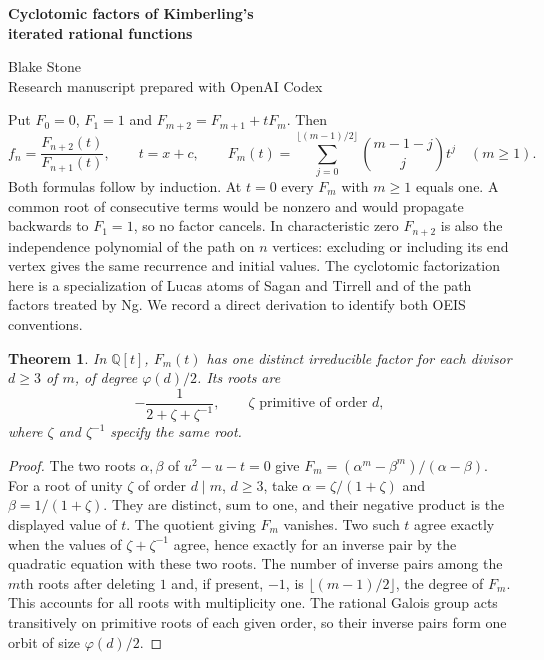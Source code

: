 \documentclass[11pt,letterpaper]{article}
\newtheorem{theorem}{Theorem}
\begin{document}
\thispagestyle{plain}
\begin{center}
{\LARGE\bfseries Cyclotomic factors of Kimberling's\\[0.12em] iterated rational functions\par}
\vspace{0.5em}
Blake Stone\\
{\small Research manuscript prepared with OpenAI Codex}
\end{center}

\begin{abstract}
Starting from $f_0=1$, iterate $f_n=1+(x+c)/f_{n-1}$. Over the rationals the reduced numerator for $n>2$ is irreducible exactly when $n+2$ is prime, as Clark Kimberling conjectured. We identify the problem with the known factorization of path independence polynomials, explain the different indexing of the tiling triangle, and describe the degrees and multiplicities of all factors over finite fields.
\end{abstract}

Put $F_0=0$, $F_1=1$ and $F_{m+2}=F_{m+1}+tF_m$. Then
\[
 f_n=\frac{F_{n+2}(t)}{F_{n+1}(t)},\qquad t=x+c,\qquad
 F_m(t)=\sum_{j=0}^{\lfloor(m-1)/2\rfloor}\binom{m-1-j}{j}t^j\quad(m\ge1).
\]
Both formulas follow by induction. At $t=0$ every $F_m$ with $m\ge1$ equals one. A common root of consecutive terms would be nonzero and would propagate backwards to $F_1=1$, so no factor cancels. In characteristic zero $F_{n+2}$ is also the independence polynomial of the path on $n$ vertices: excluding or including its end vertex gives the same recurrence and initial values. The cyclotomic factorization here is a specialization of Lucas atoms of Sagan and Tirrell and of the path factors treated by Ng. We record a direct derivation to identify both OEIS conventions.

\begin{theorem}
In $\mathbb Q[t]$, $F_m(t)$ has one distinct irreducible factor for each divisor $d\ge3$ of $m$, of degree $\varphi(d)/2$. Its roots are
\[
          -\frac{1}{2+\zeta+\zeta^{-1}},
          \qquad \zeta\text{ primitive of order }d,
\]
where $\zeta$ and $\zeta^{-1}$ specify the same root.
\end{theorem}
\begin{proof}
The two roots $\alpha,\beta$ of $u^2-u-t=0$ give
$F_m=(\alpha^m-\beta^m)/(\alpha-\beta)$. For a root of unity $\zeta$ of order $d\mid m$, $d\ge3$, take $\alpha=\zeta/(1+\zeta)$ and $\beta=1/(1+\zeta)$. They are distinct, sum to one, and their negative product is the displayed value of $t$. The quotient giving $F_m$ vanishes. Two such $t$ agree exactly when the values of $\zeta+\zeta^{-1}$ agree, hence exactly for an inverse pair by the quadratic equation with these two roots. The number of inverse pairs among the $m$th roots after deleting $1$ and, if present, $-1$, is $\lfloor(m-1)/2\rfloor$, the degree of $F_m$. This accounts for all roots with multiplicity one. The rational Galois group acts transitively on primitive roots of each given order, so their inverse pairs form one orbit of size $\varphi(d)/2$.
\end{proof}
\end{document}
